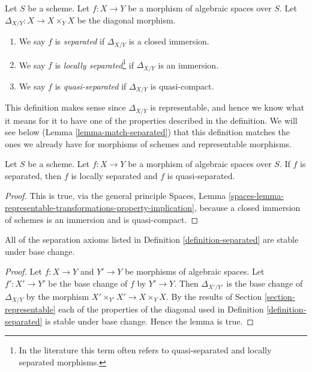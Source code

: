 \begin{definition}
\label{definition-separated}
Let $S$ be a scheme.
Let $f : X \to Y$ be a morphism of algebraic spaces over $S$.
Let $\Delta_{X/Y} : X \to X \times_Y X$ be the diagonal morphism.
\begin{enumerate}
\item We say $f$ is {\it separated} if $\Delta_{X/Y}$ is a closed immersion.
\item We say $f$ is {\it locally separated}\footnote{In the literature
this term often refers to quasi-separated and locally separated morphisms.}
if $\Delta_{X/Y}$ is an immersion.
\item We say $f$ is {\it quasi-separated} if $\Delta_{X/Y}$ is quasi-compact.
\end{enumerate}
\end{definition}

\noindent
This definition makes sense since $\Delta_{X/Y}$ is representable,
and hence we know what it means for it to have one of the properties
described in the definition. We will see below
(Lemma \ref{lemma-match-separated}) that this definition matches the ones
we already have for morphisms of schemes and representable morphisms.

\begin{lemma}
\label{lemma-trivial-implications}
Let $S$ be a scheme. Let $f : X \to Y$ be a morphism of algebraic spaces
over $S$. If $f$ is separated, then $f$ is locally separated and
$f$ is quasi-separated.
\end{lemma}

\begin{proof}
This is true, via the general principle
Spaces,
Lemma \ref{spaces-lemma-representable-transformations-property-implication},
because a closed immersion of schemes is an immersion and is quasi-compact.
\end{proof}

\begin{lemma}
\label{lemma-base-change-separated}
All of the separation axioms listed in Definition \ref{definition-separated}
are stable under base change.
\end{lemma}

\begin{proof}
Let $f : X \to Y$ and $Y' \to Y$ be morphisms of algebraic spaces.
Let $f' : X' \to Y'$ be the base change of $f$ by $Y' \to Y$. Then
$\Delta_{X'/Y'}$ is the base change of $\Delta_{X/Y}$ by
the morphism $X' \times_{Y'} X' \to X \times_Y X$. By the results of
Section \ref{section-representable}
each of the properties of the diagonal used in
Definition \ref{definition-separated}
is stable under base change. Hence the lemma is true.
\end{proof}

